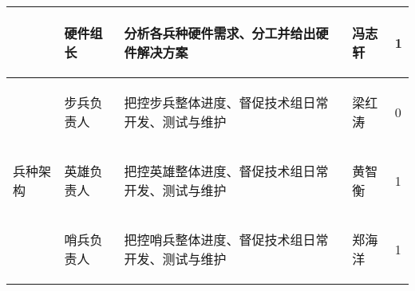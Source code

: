 \begin{longtable}{X | X | X | X | X}
    \cline{2-5}

        &
        \begin{center}
            硬件组长
        \end{center}&
        分析各兵种硬件需求、分工并给出硬件解决方案 &
        \begin{center}
            冯志轩
        \end{center} &
        \begin{center}
            1
        \end{center}\\

    \hline

        \multirow{8}{*}{兵种架构} &
        \begin{center}
            步兵负责人
        \end{center}&
        把控步兵整体进度、督促技术组日常开发、测试与维护 &
        \begin{center}
            梁红涛
        \end{center} &
        \begin{center}
            0
        \end{center}\\

    \cline{2-5}

        &
        \begin{center}
            英雄负责人
        \end{center}&
        把控英雄整体进度、督促技术组日常开发、测试与维护 &
        \begin{center}
            黄智衡
        \end{center}&
        \begin{center}
            1
        \end{center}\\

    \cline{2-5}

        &
        \begin{center}
            哨兵负责人
        \end{center} &
        把控哨兵整体进度、督促技术组日常开发、测试与维护 &
        \begin{center}
            郑海洋
        \end{center}&
        \begin{center}
            1
        \end{center}\\

    \cline{2-5}


\end{longtable}
